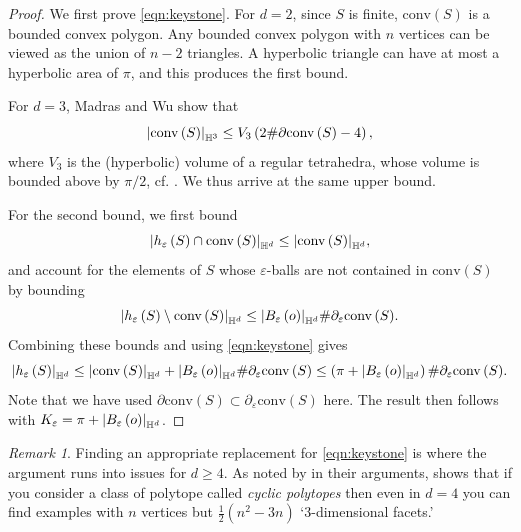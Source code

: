 \documentclass[10pt,a4paper,dvipsnames]{article}
\theoremstyle{definition}
\theoremstyle{remark}
\newtheorem{remark}[theorem]{Remark}
\newcommand{\HypThree}{{\mathbb{H}^3}}
\newcommand{\HypDim}{{\mathbb{H}^d}}
\newcommand{\convex}[1]{{\mathrm{conv}\left(#1\right)}}
\DeclarePairedDelimiter\abs{\lvert}{\rvert}
\newcommand{\habst}[1]{\abs*{#1}_\HypThree}
\newcommand{\habsd}[1]{\abs*{#1}_\HypDim}
\newcommand{\orig}{o}
\numberwithin{equation}{section}
\begin{document}
\begin{proof}
    We first prove \eqref{eqn:keystone}. 
    For $d=2$, since $S$ is finite, $\convex{S}$ is a bounded convex polygon. Any bounded convex polygon with $n$ vertices can be viewed as the union of $n-2$ triangles. A hyperbolic triangle can have at most a hyperbolic area of $\pi$, and this produces the first bound.

    For $d=3$, Madras and Wu \cite[Lemma 8]{madras2010trees} show that 
    \begin{equation}
        \habst{\convex{S}}\le V_3 \left(2\#\partial\convex{S}-4\right),
    \end{equation}
    where $V_3$ is the (hyperbolic) volume of a regular tetrahedra, whose volume is bounded above by $\pi/2$, cf. \cite[Prop. 2]{haagerup1981simplices}. We thus arrive at the same upper bound. 

    For the second bound, we first bound
    \begin{equation}
        \habsd{h_\varepsilon\left(S\right)\cap \convex{S}} \leq \habsd{\convex{S}},
    \end{equation}
    and account for the elements of $S$ whose $\varepsilon$-balls are not contained in $\convex{S}$ by bounding
    \begin{equation}
        \habsd{h_\varepsilon\left(S\right)\setminus \convex{S}} \leq \habsd{B_\varepsilon\left(\orig\right)} \#\partial_\varepsilon \convex{S}.
    \end{equation}
    Combining these bounds and using \eqref{eqn:keystone} gives
    \begin{equation}
        \habsd{h_\varepsilon\left(S\right)} \leq \habsd{\convex{S}} + \habsd{B_\varepsilon\left(\orig\right)} \#\partial_\varepsilon \convex{S} \leq \left(\pi + \habsd{B_\varepsilon\left(\orig\right)}\right)\#\partial_\varepsilon \convex{S}.
    \end{equation}
    Note that we have used $\partial \convex{S}\subset \partial_\varepsilon\convex{S}$ here. The result then follows with $K_\varepsilon = \pi+\habsd{B_\varepsilon\left(\orig\right)}$.
\end{proof}

\begin{remark}\label{rem:dge4}
    Finding an appropriate replacement for \eqref{eqn:keystone} is where the argument runs into issues for $d\geq 4$. As noted by \cite{madras2010trees} in their arguments, \cite{grunbaum2003convex} shows that if you consider a class of polytope called \emph{cyclic polytopes} then even in $d=4$ you can find examples with $n$ vertices but $\frac{1}{2}\left(n^2-3n\right)$ `$3$-dimensional facets.'
\end{remark}
\end{document}
